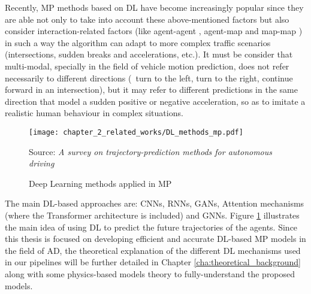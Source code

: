 Recently, \ac{MP} methods based on \ac{DL} have become increasingly popular since they are able not only to take into account these above-mentioned factors but also consider interaction-related factors (like agent-agent \cite{gupta2018social}, agent-map \cite{casas2018intentnet} and map-map \cite{liang2020learning}) in such a way the algorithm can adapt to more complex traffic scenarios (intersections, sudden breaks and accelerations, etc.). It must be consider that multi-modal, specially in the field of vehicle motion prediction, does not refer necessarily to different directions (\eg \ turn to the left, turn to the right, continue forward in an intersection), but it may refer to different predictions in the same direction that model a sudden positive or negative acceleration, so as to imitate a realistic human behaviour in complex situations. %

\begin{figure}[h]
	\centering
	\texttt{[image: chapter\_2\_related\_works/DL\_methods\_mp.pdf]}
	\caption{Deep Learning methods applied in \ac{MP}}
	Source: \textit{A survey on trajectory-prediction methods for autonomous driving} \cite{huang2022survey}
	\label{fig:chapter_2_related_works/DL_example_mp}
\end{figure}

The main \ac{DL}-based approaches are: \acp{CNN}, \acp{RNN}, \acp{GAN}, Attention mechanisms (where the Transformer architecture is included) and \acp{GNN}. Figure \ref{fig:chapter_2_related_works/DL_example_mp} illustrates the main idea of using \ac{DL} to predict the future trajectories of the agents. Since this thesis is focused on developing efficient and accurate \ac{DL}-based \ac{MP} models in the field of \ac{AD}, the theoretical explanation of the different \ac{DL} mechanisms used in our pipelines will be further detailed in Chapter \ref{cha:theoretical_background} along with some physics-based models theory to fully-understand the proposed models. %

